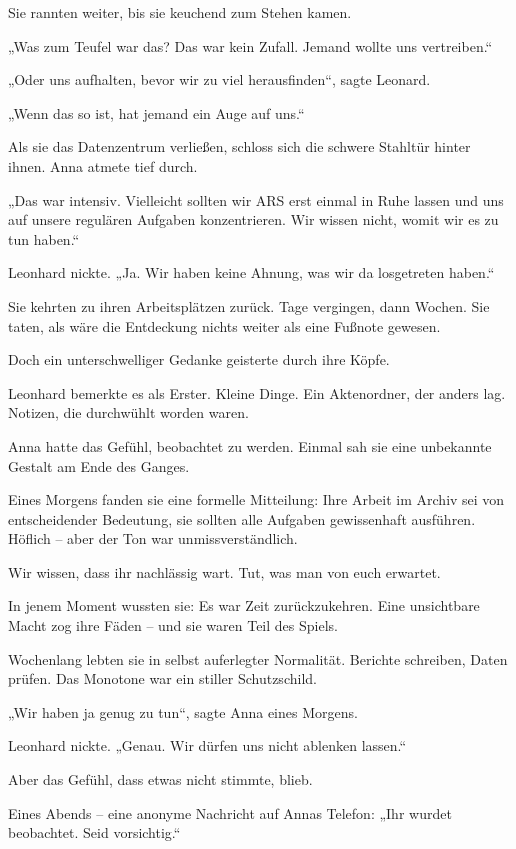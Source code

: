\documentclass[
]{article}
\begin{document}
Sie rannten weiter, bis sie keuchend zum Stehen kamen.

„Was zum Teufel war das? Das war kein Zufall. Jemand wollte uns vertreiben.``

„Oder uns aufhalten, bevor wir zu viel herausfinden``, sagte Leonard.

„Wenn das so ist, hat jemand ein Auge auf uns.``

Als sie das Datenzentrum verließen, schloss sich die schwere Stahltür hinter ihnen. Anna atmete tief durch.

„Das war intensiv. Vielleicht sollten wir ARS erst einmal in Ruhe lassen und uns auf unsere regulären Aufgaben konzentrieren. Wir wissen nicht, womit wir es zu tun haben.``

Leonhard nickte. „Ja. Wir haben keine Ahnung, was wir da losgetreten haben.``

Sie kehrten zu ihren Arbeitsplätzen zurück. Tage vergingen, dann Wochen. Sie taten, als wäre die Entdeckung nichts weiter als eine Fußnote gewesen.

Doch ein unterschwelliger Gedanke geisterte durch ihre Köpfe.

Leonhard bemerkte es als Erster. Kleine Dinge. Ein Aktenordner, der anders lag. Notizen, die durchwühlt worden waren.

Anna hatte das Gefühl, beobachtet zu werden. Einmal sah sie eine unbekannte Gestalt am Ende des Ganges.

Eines Morgens fanden sie eine formelle Mitteilung: Ihre Arbeit im Archiv sei von entscheidender Bedeutung, sie sollten alle Aufgaben gewissenhaft ausführen. Höflich -- aber der Ton war unmissverständlich.

Wir wissen, dass ihr nachlässig wart. Tut, was man von euch erwartet.

In jenem Moment wussten sie: Es war Zeit zurückzukehren. Eine unsichtbare Macht zog ihre Fäden -- und sie waren Teil des Spiels.

Wochenlang lebten sie in selbst auferlegter Normalität. Berichte schreiben, Daten prüfen. Das Monotone war ein stiller Schutzschild.

„Wir haben ja genug zu tun``, sagte Anna eines Morgens.

Leonhard nickte. „Genau. Wir dürfen uns nicht ablenken lassen.``

Aber das Gefühl, dass etwas nicht stimmte, blieb.

Eines Abends -- eine anonyme Nachricht auf Annas Telefon: „Ihr wurdet beobachtet. Seid vorsichtig.``
\end{document}
